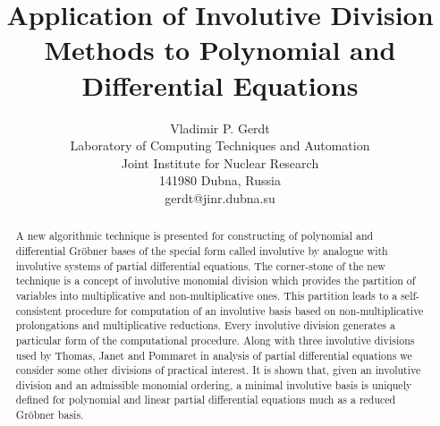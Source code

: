 \textwidth 155mm
\textheight 220mm
\topmargin -24pt
\oddsidemargin 0.5cm
\evensidemargin 0.5cm
\def\Gr{Gr\"obner }

\title{\bf Application of Involutive Division Methods to Polynomial
 and Differential Equations}
\author{Vladimir P. Gerdt \\
Laboratory of Computing Techniques and Automation\\
       Joint Institute for Nuclear Research\\
       141980 Dubna, Russia \\
       gerdt@jinr.dubna.su}
\date{}
\maketitle
\begin{abstract} A new algorithmic technique is presented
for constructing of polynomial and differential \Gr bases of the
special form called involutive by analogue with involutive systems of
partial differential equations. The corner-stone of the new technique is a
concept of involutive monomial division which provides the partition
of variables into multiplicative and non-multiplicative ones. This
partition leads to a self-consistent procedure for computation of an
involutive basis based on non-multiplicative prolongations and
multiplicative reductions. Every involutive division generates a
particular form of the computational procedure. Along with three
involutive divisions used by Thomas, Janet and Pommaret in analysis
of partial differential equations we consider some other divisions
of practical interest. It is shown that, given an involutive division
and an admissible monomial ordering, a minimal involutive basis is
uniquely defined for polynomial and linear partial differential equations
much as a reduced \Gr basis.
\end{abstract}


